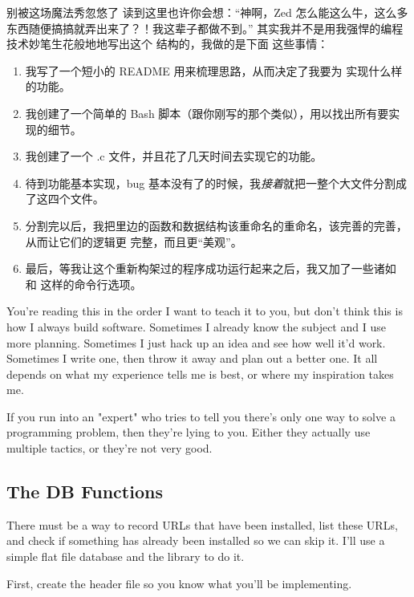 \begin{aside}{别被这场魔法秀忽悠了}
读到这里也许你会想：“神啊，Zed 怎么能这么牛，这么多东西随便搞搞就弄出来了？！我这辈子都做不到。”
其实我并不是用我强悍的编程技术妙笔生花般地地写出这个  结构的，我做的是下面
这些事情：

\begin{enumerate}
\item 我写了一个短小的 README 用来梳理思路，从而决定了我要为  实现什么样
    的功能。
\item 我创建了一个简单的 Bash 脚本（跟你刚写的那个类似），用以找出所有要实现的细节。
\item 我创建了一个 .c 文件，并且花了几天时间去实现它的功能。
\item 待到功能基本实现，bug 基本没有了的时候，我\emph{接着}就把一整个大文件分割成了这四个文件。
\item 分割完以后，我把里边的函数和数据结构该重命名的重命名，该完善的完善，从而让它们的逻辑更
    完整，而且更“美观”。
\item 最后，等我让这个重新构架过的程序成功运行起来之后，我又加了一些诸如  和
     这样的命令行选项。
\end{enumerate}

You're reading this in the order I want to teach it to you, but don't think
this is how I always build software.  Sometimes I already know the subject and
I use more planning.  Sometimes I just hack up an idea and see how well it'd
work.  Sometimes I write one, then throw it away and plan out a better one.  It
all depends on what my experience tells me is best, or where my inspiration
takes me.

If you run into an "expert" who tries to tell you there's only one
way to solve a programming problem, then they're lying to you.  Either
they actually use multiple tactics, or they're not very good.
\end{aside}

\subsection{The DB Functions}

There must be a way to record URLs that have been installed, list these
URLs, and check if something has already been installed so we can
skip it.  I'll use a simple flat file database and the 
library to do it.

First, create the  header file so you know what you'll be
implementing.

